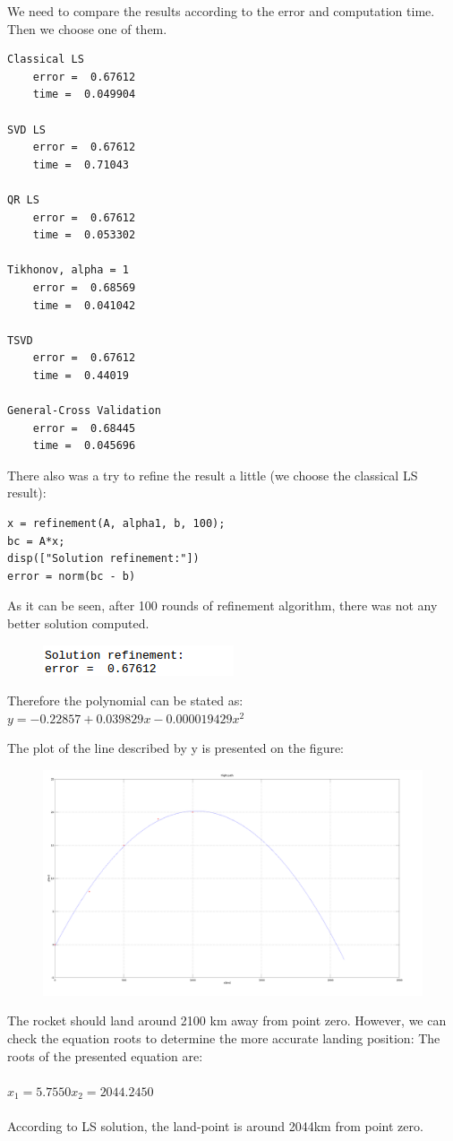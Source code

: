 \documentclass[eng,openany]{mgr}
\begin{document}
We need to compare the results according to the error and computation time. Then we choose one of them.
\begin{lstlisting}
Classical LS
	error =  0.67612
	time =  0.049904

SVD LS
	error =  0.67612
	time =  0.71043

QR LS
	error =  0.67612
	time =  0.053302

Tikhonov, alpha = 1
	error =  0.68569
	time =  0.041042

TSVD
	error =  0.67612
	time =  0.44019

General-Cross Validation
	error =  0.68445
	time =  0.045696
\end{lstlisting}

There also was a try to refine the result a little (we choose the classical LS result):
\begin{lstlisting}
x = refinement(A, alpha1, b, 100);
bc = A*x;
disp(["Solution refinement:"])
error = norm(bc - b)
\end{lstlisting}
As it can be seen, after 100 rounds of refinement algorithm, there was not any better solution computed.
\begin{figure}[h]
\centering
\includegraphics[width=0.45\linewidth]{screenshot015}
\label{fig:screenshot015}
\end{figure}

Therefore the polynomial can be stated as:\\
\begin{math}
y = -0.22857 + 0.039829 x -0.000019429 x^2
\end{math}

The plot of the line described by y is presented on the figure:
\begin{figure}[h]
\centering
\includegraphics[width=0.7\linewidth]{screenshot016}
\caption{}
\label{fig:screenshot016}
\end{figure}
The rocket should land around 2100 km away from point zero. However, we can check the equation roots to determine the more accurate landing position:
The roots of the presented equation are:\\\\
\begin{math}
x_1 = 5.7550
x_2 = 2044.2450
\end{math}
\\\\According to LS solution, the land-point is around 2044km from point zero.
\newpage
\end{document}
